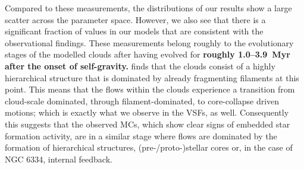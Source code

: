 Compared to these measurements, the distributions of our results show a large scatter across the parameter space. 
However, we also see that there is a significant fraction of values in our models that are consistent with the observational findings. 
These measurements belong roughly to the evolutionary stages of the modelled clouds after having evolved for \textbf{roughly 1.0--3.9~Myr after the onset of self-gravity.}
 finds that the clouds consist of a highly hierarchical structure that is dominated by already fragmenting filaments at this point.
This means that the flows within the clouds experience a transition from cloud-scale dominated, through filament-dominated, to core-collapse driven motions; which is exactly what we observe in the VSFs, as well.
Consequently this suggests that the observed MCs, which show clear signs of embedded star formation activity, are in a similar stage where flows are dominated by the formation of hierarchical structures, (pre-/proto-)stellar cores or, in the case of NGC 6334, internal feedback.

